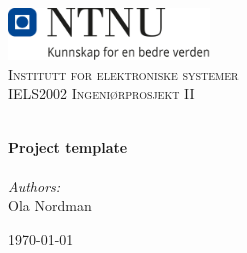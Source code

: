 
\begin{titlepage}
\vbox{ }
\vbox{ }
\begin{center}
\includegraphics[width=0.40\textwidth]{Images/NTNU_logo.png}\\[1cm]
\textsc{\LARGE Institutt for elektroniske systemer}\\[1.5cm]
\textsc{\Large IELS2002 Ingeniørprosjekt II}\\[0.5cm]
\vbox{ }

\HRule \\[0.4cm]
{ \huge \bfseries Project template}\\[0.4cm]
\HRule \\[1.5cm]

\large
\emph{Authors:}\\
    Ola Nordman



\vfill

{\large \today}
\end{center}
\end{titlepage}